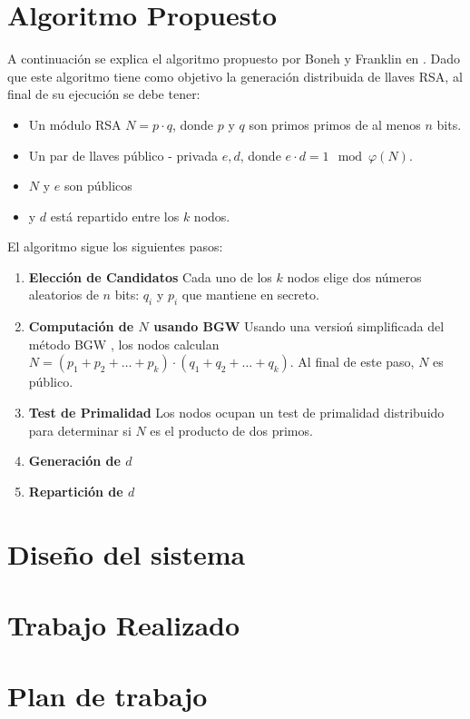 \documentclass[12pt,letterpaper]{article}
\begin{document}
\section{Algoritmo Propuesto}
A continuación se explica el algoritmo propuesto por Boneh y Franklin en \cite{bonehfranklin01}.
Dado que este algoritmo tiene como objetivo la generación distribuida de llaves RSA, al final de su ejecución se debe tener:
\begin{itemize}
\item Un módulo RSA $N = p \cdot q$, donde $p$ y $q$ son primos primos de al menos $n$ bits.
\item Un par de llaves público - privada $e, d$, donde $e \cdot d = 1 \mod \varphi(N)$.
\item $N$ y $e$ son públicos
\item y $d$ está repartido entre los $k$ nodos.
\end{itemize}
El algoritmo sigue los siguientes pasos:
\begin{enumerate}[label=\textbf{\arabic*})]
\item \textbf{Elección de Candidatos}
Cada uno de los $k$ nodos elige dos números aleatorios de $n$ bits: $q_i$ y $p_i$ que mantiene en secreto. 
\item \textbf{Computación de $N$ usando BGW}
Usando una versioń simplificada del método BGW , los nodos calculan $N = (p_1 + p_2 + \ldots + p_k)\cdot(q_1 + q_2 + \ldots + q_k)$. Al final de este paso, $N$ es público.
\item \textbf{Test de Primalidad}
Los nodos ocupan un test de primalidad distribuido para determinar si $N$ es el producto de dos primos. 
\item \textbf{Generación de $d$}

\item \textbf{Repartición de $d$}
\end{enumerate}

\section{Diseño del sistema}

\section{Trabajo Realizado}


\section{Plan de trabajo}



 
\end{document}

